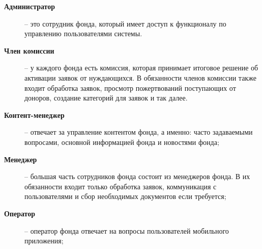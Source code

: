 \begin{description}
		\item[\textbf{Администратор}] -- это сотрудник фонда, который имеет доступ к функционалу по управлению пользователями системы.
		\item[\textbf{Член комиссии}] -- у каждого фонда есть комиссия, которая принимает итоговое решение об активации заявок от нуждающихся. В обязанности членов комиссии также входит обработка заявок, просмотр пожертвований поступающих от доноров, создание категорий для заявок и так далее.
		\item[\textbf{Контент-менеджер}] -- отвечает за управление контентом фонда, а именно: часто задаваемыми вопросами, основной информацией фонда и новостями фонда;
		\item[\textbf{Менеджер}] -- большая часть сотрудников фонда состоит из менеджеров фонда. В их обязанности входит только обработка заявок, коммуникация с пользователями и сбор необходимых документов если требуется;
		\item[\textbf{Оператор}] -- оператор фонда отвечает на вопросы пользователей мобильного приложения;
\end{description}